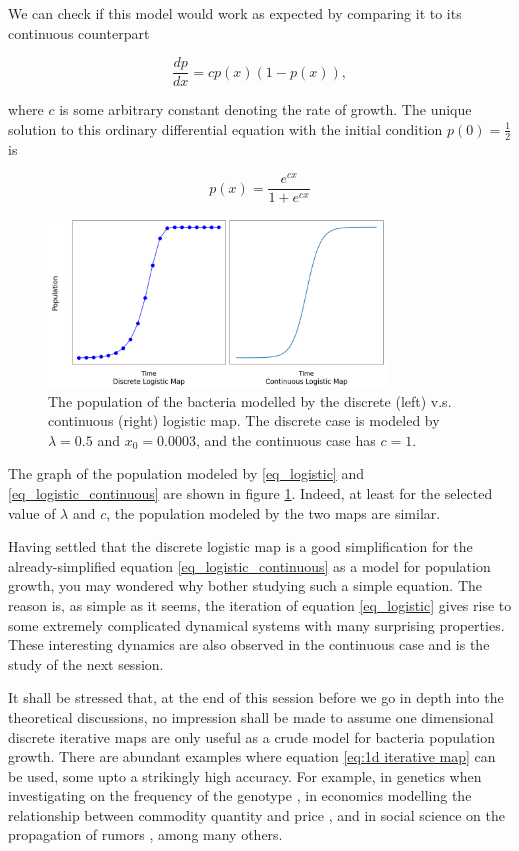 We can check if this model would work as expected by comparing it to its continuous counterpart 

\begin{equation}\label{eq_logistic_continuous}
	\frac{dp}{dx} = c p(x) (1-p(x)),
\end{equation}

where $c$ is some arbitrary constant denoting the rate of growth. 
The unique solution to this ordinary differential equation with the initial condition $p(0) = \frac{1}{2}$ is 

$$
p(x) = \frac{e^{cx}}{1+e^{cx}}
$$

\begin{figure}
	\centering
	\includegraphics[width=0.8\textwidth]{./figures/con_vs_discrete_logistic_map.png}
	\caption{The population of the bacteria modelled by the discrete (left) v.s. continuous (right) logistic map. 
	The discrete case is modeled by $\lambda = 0.5$ and $x_0 = 0.0003$, and the continuous case has $c=1$.}
	\label{fig:con_vs_discrete}
\end{figure}

The graph of the population modeled by \eqref{eq_logistic} and \eqref{eq_logistic_continuous} are shown in figure \ref{fig:con_vs_discrete}.
Indeed, at least for the selected value of $\lambda$ and $c$, the population modeled by the two maps are similar.

Having settled that the discrete logistic map is a good simplification for the already-simplified equation \ref{eq_logistic_continuous} as a model for population growth, you may wondered why bother studying such a simple equation. 
The reason is, as simple as it seems, the iteration of equation \ref{eq_logistic} gives rise to some extremely complicated dynamical systems with many surprising properties. 
These interesting dynamics are also observed in the continuous case and is the study of the next session.

It shall be stressed that, at the end of this session before we go in depth into the theoretical discussions, no impression shall be made to assume one dimensional discrete iterative maps are only useful as a crude model for bacteria population growth. 
There are abundant examples where equation \eqref{eq:1d iterative map} can be used, some upto a strikingly high accuracy. 
For example, in genetics when investigating on the frequency of the genotype \cite{genotype}, in economics modelling the relationship between commodity quantity and price \cite{economics}, and in social science on the propagation of rumors \cite{social_science}, among many others.


